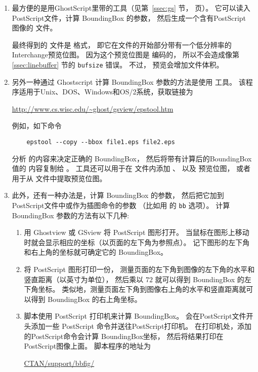 \begin{enumerate}
	\item 最方便的是用GhostScript里带的工具（见第~\ref{ssec:gs} 节，\pageref{ssec:gs} 页）。
	它可以读入PostScript文件，计算 BoundingBox 的参数，
	然后生成一个含有PostScript 图像的 文件。
	
	最终得到的  文件是  格式，
	即它在文件的开始部分带有一个低分辨率的Interchange预览位图。
	因为这个预览位图是 \ascii 编码的，
	所以不会造成像第 \ref{ssec:linebuffer} 节的 \texttt{bufsize} 错误。
	不过， 预览会增加文件体积。
	\item 另外一种通过 Ghostscript 计算 BoundingBox 参数的方法是使用  工具。
	该程序适用于Unix、DOS、Windows和OS/2系统，获取链接为
	\begin{center}
		\url{http://www.cs.wisc.edu/~ghost/gsview/epstool.htm}
	\end{center}
	例如，如下命令
\begin{verbatim}
    epstool --copy --bbox file1.eps file2.eps
\end{verbatim}
	分析  的内容来决定正确的 BoundingBox，
	然后将带有计算后的BoundingBox值的  内容复制给 。
	 工具还可以用于在  文件内添加 、 以及  预览位图，
	或者用于从  文件中提取预览位图。
	
	\item 此外，还有一种办法是，计算 BoundingBox 的参数，
	然后把它加到PostScript文件中或作为插图命令的参数
	（比如用  的 \texttt{bb} 选项）。
	计算BoundingBox 参数的方法有以下几种:	
	\begin{enumerate}
		\item 用 Ghostview 或 GSview 将 PostScript 图形打开。
		当鼠标在图形上移动时就会显示相应的坐标（以页面的左下角为参照点）。
		记下图形的左下角和右上角的坐标就可确定它的 BoundingBox。
		\item 将 PostScript 图形打印一份，
		测量页面的左下角到图像的左下角的水平和竖直距离（以英寸为单位），
		然后乘以 $72$ 就可以得到 BoundingBox 的左下角坐标。
		类似地，测量页面左下角到图像右上角的水平和竖直距离就可以得到 BoundingBox 的右上角坐标。
		\item {} 脚本使用 PostScript 打印机来计算 BoundingBox。
		 会在PostScript文件开头添加一些 PostScript 命令并送往PostScript打印机。
		在打印机处，添加的PostScript命令会计算 BoundingBox坐标，
		然后将结果打印在PostScript图像上面。
		 脚本程序的地址为
		\begin{center}
			\href{ftp://ctan.tug.org/tex-archive/support/bbfig/}{CTAN/support/bbfig/}
		\end{center}		
	\end{enumerate}
\end{enumerate}

